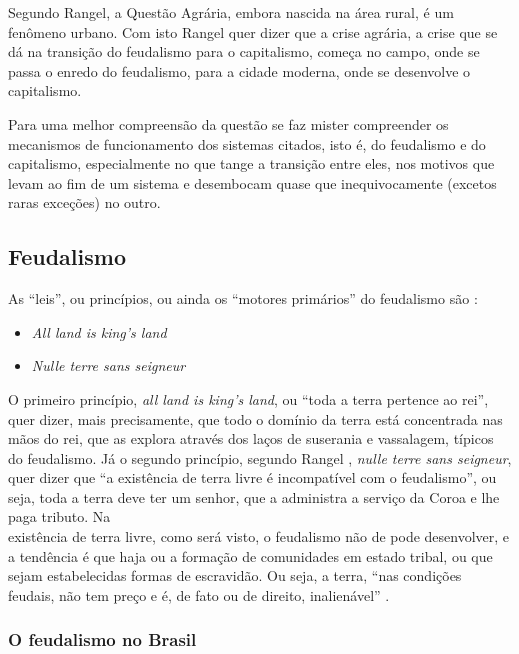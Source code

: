 \documentclass[
	12pt,				%
	oneside,			%
	a4paper,			%
	chapter=TITLE,		%
	section=TITLE,		%
	english,			%
	brazil				%
	]{abntex2}
\begin{document}
Segundo Rangel, a Questão Agrária, embora nascida na área rural, é um
fenômeno urbano. Com isto Rangel quer dizer que a crise agrária, a crise
que se dá na transição do feudalismo para o capitalismo, começa no
campo, onde se passa o enredo do feudalismo, para a cidade moderna, onde
se desenvolve o capitalismo.

Para uma melhor compreensão da questão se faz mister compreender os
mecanismos de funcionamento dos sistemas citados, isto é, do feudalismo
e do capitalismo, especialmente no que tange a transição entre eles, nos
motivos que levam ao fim de um sistema e desembocam quase que
inequivocamente (excetos raras exceções) no outro.

\subsection{Feudalismo}\label{feudalismo}

As ``leis'', ou princípios, ou ainda os ``motores primários'' do
feudalismo são \autocite[126]{rangel1985}:
\begin{itemize}
\tightlist
\item
  \emph{All land is king's land}
\item
  \emph{Nulle terre sans seigneur}
\end{itemize}
O primeiro princípio, \emph{all land is king's land}, ou ``toda a terra
pertence ao rei'', quer dizer, mais precisamente, que todo o domínio da
terra está concentrada nas mãos do rei, que as explora através dos laços
de suserania e vassalagem, típicos do feudalismo. Já o segundo
princípio, segundo Rangel \autocite*[219]{rangel1961}, \emph{nulle terre
sans seigneur}, quer dizer que ``a existência de terra livre é
incompatível com o feudalismo'', ou seja, toda a terra deve ter um
senhor, que a administra a serviço da Coroa e lhe paga tributo. Na\\
existência de terra livre, como será visto, o feudalismo não de pode
desenvolver, e a tendência é que haja ou a formação de comunidades em
estado tribal, ou que sejam estabelecidas formas de escravidão. Ou seja,
a terra, ``nas condições feudais, não tem preço e é, de fato ou de
direito, inalienável'' \autocite[206]{rangel1960}.

\subsubsection{O feudalismo no Brasil}\label{o-feudalismo-no-brasil}
\end{document}
